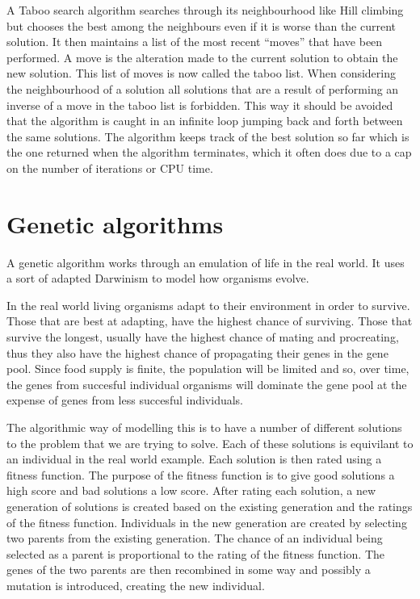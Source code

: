 A Taboo search algorithm searches through its neighbourhood like Hill
climbing but chooses the best among the neighbours even if it is worse
than the current solution. It then maintains a list of the most recent
``moves'' that have been performed. A move is the alteration made to
the current solution to obtain the new solution. This list of moves is
now called the taboo list. When considering the neighbourhood of a
solution all solutions that are a result of performing an inverse of a
move in the taboo list is forbidden. This way it should be avoided
that the algorithm is caught in an infinite loop jumping back and
forth between the same solutions. The algorithm keeps track of the
best solution so far which is the one returned when the algorithm
terminates, which it often does due to a cap on the number of
iterations or CPU time.

\section{Genetic algorithms}
\label{sec:genetic_algorithm}

%

A genetic algorithm works through an emulation of life in the real
world. It uses a sort of adapted Darwinism to model how organisms
evolve. 

In the real world living organisms adapt to their environment in order
to survive. Those that are best at adapting, have the highest chance
of surviving. Those that survive the longest, usually have the highest
chance of mating and procreating, thus they also have the highest
chance of propagating their genes in the gene pool. Since food supply
is finite, the population will be limited and so, over time, the genes
from succesful individual organisms will dominate the gene pool at the
expense of genes from less succesful individuals.

The algorithmic way of modelling this is to have a number of different
solutions to the problem that we are trying to solve. Each of these
solutions is equivilant to an individual in the real world
example. Each solution is then rated using a fitness function. The
purpose of the fitness function is to give good solutions a high score
and bad solutions a low score. After rating each solution, a new
generation of solutions is created based on the existing generation
and the ratings of the fitness function. Individuals in the new
generation are created by selecting two parents from the existing
generation. The chance of an individual being selected as a parent is
proportional to the rating of the fitness function. The genes of the
two parents are then recombined in some way and possibly a mutation is
introduced, creating the new individual.


